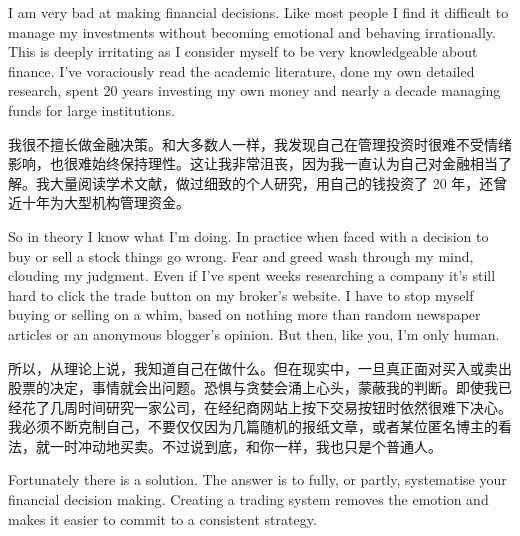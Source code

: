 

\begin{englishblock} I am very bad at making financial decisions. Like most people I find it difficult to manage my investments without becoming emotional and behaving irrationally. This is deeply irritating as I consider myself to be very knowledgeable about finance. I've voraciously read the academic literature, done my own detailed research, spent 20 years investing my own money and nearly a decade managing funds for large institutions. \end{englishblock}

\begin{chineseblock}我很不擅长做金融决策。和大多数人一样，我发现自己在管理投资时很难不受情绪影响，也很难始终保持理性。这让我非常沮丧，因为我一直认为自己对金融相当了解。我大量阅读学术文献，做过细致的个人研究，用自己的钱投资了 20 年，还曾近十年为大型机构管理资金。\end{chineseblock}

\bipairgap

\begin{englishblock} So in theory I know what I'm doing. In practice when faced with a decision to buy or sell a stock things go wrong. Fear and greed wash through my mind, clouding my judgment. Even if I've spent weeks researching a company it's still hard to click the trade button on my broker's website. I have to stop myself buying or selling on a whim, based on nothing more than random newspaper articles or an anonymous blogger's opinion. But then, like you, I'm only human. \end{englishblock}

\begin{chineseblock}所以，从理论上说，我知道自己在做什么。但在现实中，一旦真正面对买入或卖出股票的决定，事情就会出问题。恐惧与贪婪会涌上心头，蒙蔽我的判断。即使我已经花了几周时间研究一家公司，在经纪商网站上按下交易按钮时依然很难下决心。我必须不断克制自己，不要仅仅因为几篇随机的报纸文章，或者某位匿名博主的看法，就一时冲动地买卖。不过说到底，和你一样，我也只是个普通人。\end{chineseblock}

\bipairgap

\begin{englishblock} Fortunately there is a solution. The answer is to fully, or partly, systematise your financial decision making. Creating a trading system removes the emotion and makes it easier to commit to a consistent strategy. \end{englishblock}

